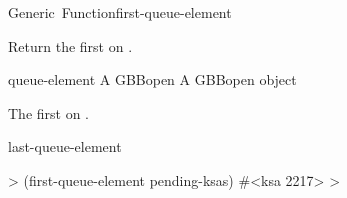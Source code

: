 \documentclass[10pt,twoside,english,pdftex]{article}
\begin{document}

\begin{functiondoc}{Generic~Function}{first-queue-element}{
    }
%
%

\fnsyntax

\fnpurpose Return the first  on .

\fnmethods
{}

\fnpackage {}

\fnmodule {}

\fnargs
\begin{args}{queue-element}
\arg[queue] A GBBopen 
 A GBBopen  object
\end{args}

\fnreturns The first  on .
  
\begin{alsos}{last-queue-element}
\end{alsos}

\fnexample
%
\W\supp
\begin{example}
  > (first-queue-element pending-ksas)
  #<ksa 2217>
  >
\end{example}

\end{functiondoc}

\end{document}
